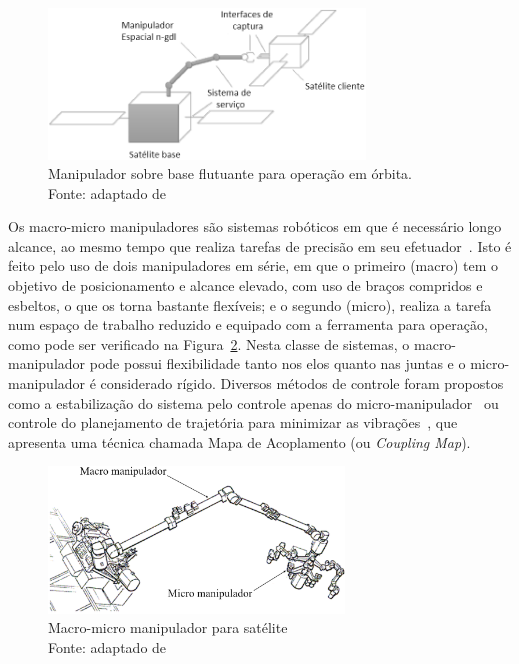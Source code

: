 \begin{figure}[h]
	\centering 
 	\includegraphics[width=0.75\textwidth]{figs/space_robot}
 	\caption[Manipulador sobre base flutuante em órbita]{Manipulador sobre base
 	flutuante para operação em órbita. \\ Fonte: adaptado de
 	\cite{flores2014review}}
 	\label{fig::space_robot}
\end{figure}

Os macro-micro manipuladores são sistemas robóticos em que é necessário longo
alcance, ao mesmo tempo que realiza tarefas de precisão em seu
efetuador~\cite{sharon1993macro}.
Isto é feito pelo uso de dois manipuladores em série, em que o primeiro (macro)
tem o objetivo de posicionamento e alcance elevado, com uso de braços compridos
e esbeltos, o que os torna bastante flexíveis; e o segundo (micro), realiza a
tarefa num espaço de trabalho reduzido e equipado com a ferramenta para
operação, como pode ser verificado na Figura~\ref{fig::macro_micro}. Nesta
classe de sistemas, o macro-manipulador pode possui flexibilidade tanto nos elos
quanto nas juntas e o micro-manipulador é considerado rígido.
Diversos métodos de controle foram propostos como a estabilização do sistema
pelo controle apenas do micro-manipulador~\cite{book1989vibration} ou controle
do planejamento de trajetória para minimizar as vibrações~\cite{torres1993path},
que apresenta uma técnica chamada Mapa de Acoplamento (ou \textit{Coupling
Map}). 

\begin{figure}[h]
	\centering 
 	\includegraphics[width=0.70\textwidth]{figs/macro_micro}
 	\caption[Macro-micro manipulador]{Macro-micro manipulador para satélite \\
 	Fonte: adaptado de \cite{schubert2000impedance}}
 	\label{fig::macro_micro}
\end{figure}

